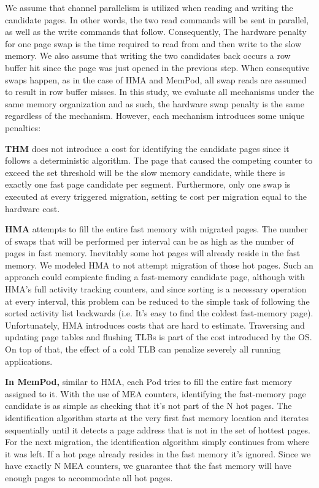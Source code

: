 We assume that channel parallelism is utilized when reading and writing the candidate pages. In other words, the two read commands will be sent in parallel, as well as the write commands that follow. Consequently, The hardware penalty for one page swap is the time required to read from and then write to the slow memory. We also assume that writing the two candidates back occurs a row buffer hit since the page was just opened in the previous step. When consequtive swaps happen, as in the case of HMA and MemPod, all swap reads are assumed to result in row buffer misses. In this study, we evaluate all mechanisms under the same memory organization and as such, the hardware swap penalty is the same regardless of the mechanism. However, each mechanism introduces some unique penalties:

	\textbf{THM} does not introduce a cost for identifying the candidate pages since it follows a deterministic algorithm. The page that caused the competing counter to exceed the set threshold will be the slow memory candidate, while there is exactly one fast page candidate per segment. Furthermore, only one swap is executed at every triggered migration, setting te cost per migration equal to the hardware cost.
	
    \textbf{HMA } attempts to fill the entire fast memory with migrated pages. The number of swaps that will be performed per interval can be as high as the number of pages in fast memory. Inevitably some hot pages will already reside in the fast memory. We modeled HMA to not attempt migration of those hot pages. Such an approach could compicate finding a fast-memory candidate page, although with HMA's full activity tracking counters, and since sorting is a necessary operation at every interval, this problem can be reduced to the simple task of following the sorted activity list backwards (i.e. It's easy to find the coldest fast-memory page). Unfortunately, HMA introduces costs that are hard to estimate. Traversing and updating page tables and flushing TLBs is part of the cost introduced by the OS. On top of that, the effect of a cold TLB can penalize severely all running applications.
	
    \textbf{In MemPod,} similar to HMA, each Pod tries to fill the entire fast memory assigned to it. With the use of MEA counters, identifying the fast-memory page candidate is as simple as checking that it's not part of the N hot pages. The identification algorithm starts at the very first fast memory location and iterates sequentially until it detects a page address that is not in the set of hottest pages. For the next migration, the identification algorithm simply continues from where it was left. If a hot page already resides in the fast memory it's ignored. Since we have exactly N MEA counters, we guarantee that the fast memory will have enough pages to accommodate all hot pages.

